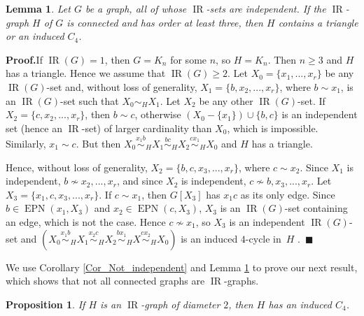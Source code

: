 \documentclass[12pt]{article}%
\newtheorem{lemma}[theorem]{Lemma}
\newtheorem{proposition}[theorem]{Proposition}
\begin{document}
\begin{lemma}
\label{Lem_Indep}Let $G$ be a graph, all of whose $\operatorname{IR}$-sets are
independent. If the $\operatorname{IR}$-graph $H$ of $G$ is connected and has
order at least three, then $H$ contains a triangle or an induced $C_{4}$.
\end{lemma}

\noindent\textbf{Proof.\hspace{0.1in}}If $\operatorname{IR}(G)=1$, then
$G=K_{n}$ for some $n$, so $H=K_{n}$. Then $n\geq3$ and $H$ has a triangle.
Hence we assume that $\operatorname{IR}(G)\geq2$. Let $X_{0}=\{x_{1}%
,...,x_{r}\}$ be any $\operatorname{IR}(G)$-set and, without loss of
generality, $X_{1}=\{b,x_{2},...,x_{r}\}$, where $b\sim x_{1}$, is an
$\operatorname{IR}(G)$-set such that $X_{0}\sim_{H}X_{1}$. Let $X_{2}$ be any
other $\operatorname{IR}(G)$-set. If $X_{2}=\{c,x_{2},...,x_{r}\}$, then
$b\sim c$, otherwise $(X_{0}-\{x_{1}\})\cup\{b,c\}$ is an independent set
(hence an $\operatorname{IR}$-set) of larger cardinality than $X_{0}$, which
is impossible. Similarly, $x_{1}\sim c$. But then $X_{0}\overset{x_{1}b}{\sim
}_{H}X_{1}\overset{bc}{\sim}_{H}X_{2}\overset{cx_{1}}{\sim}_{H}X_{0}$ and $H$
has a triangle.

Hence, without loss of generality, $X_{2}=\{b,c,x_{3},...,x_{r}\}$, where
$c\sim x_{2}$. Since $X_{1}$ is independent, $b\nsim x_{2},...,x_{r}$, and
since $X_{2}$ is independent, $c\nsim b,x_{3},...,x_{r}$. Let $X_{3}%
=\{x_{1},c,x_{3},...,x_{r}\}$. If $c\sim x_{1}$, then $G[X_{3}]$ has $x_{1}c$
as its only edge. Since $b\in\operatorname{EPN}(x_{1},X_{3})$ and $x_{2}%
\in\operatorname{EPN}(c,X_{3})$, $X_{3}$ is an $\operatorname{IR}(G)$-set
containing an edge, which is not the case. Hence $c\nsim x_{1}$, so $X_{3}$ is
an independent $\operatorname{IR}(G)$-set and $(X_{0}\overset{x_{1}b}{\sim
}_{H}X_{1}\overset{x_{2}c}{\sim}_{H}X_{2}\overset{bx_{1}}{\sim}_{H}%
X\overset{cx_{2}}{\sim}_{H}X_{0})$ is an induced $4$-cycle in~$H$%
.~$\blacksquare$

\bigskip

We use Corollary \ref{Cor_Not_independent} and Lemma \ref{Lem_Indep} to prove
our next result, which shows that not all connected graphs are
$\operatorname{IR}$-graphs.

\begin{proposition}
\label{Prop_diam2}If $H$ is an $\operatorname{IR}$-graph of diameter $2$, then
$H$ has an induced $C_{4}$.
\end{proposition}
\end{document}
